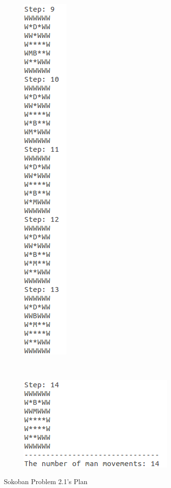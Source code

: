\documentclass[10pt, letter]{article}
\begin{document}
\begin{figure} [h!]
\begin{subfigure}{.3\textwidth}
  \includegraphics[scale = 0.35]{images/sokoban1-ans3}
\end{subfigure}\\
\begin{subfigure}{.5\textwidth}
  \centering
  \includegraphics[scale = 0.35]{images/sokoban1-ans4}
\end{subfigure}%
\caption{Sokoban Problem 2.1's Plan}
\label{sokoans1}
\end{figure}
\end{document}
